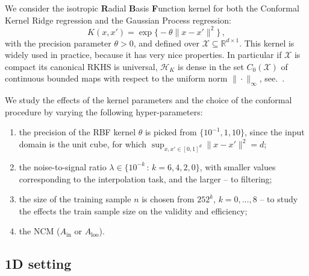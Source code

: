 \documentclass{ITaSconf}
\newcommand{\Hcal}{\mathcal{H}}
\newcommand{\Xcal}{\mathcal{X}}
\newcommand{\Real}{\mathbb{R}}
\begin{document}
We consider the isotropic \textbf{R}adial \textbf{B}asis \textbf{F}unction kernel
for both the Conformal Kernel Ridge regression and the Gaussian Process regression:
\begin{equation*}
  K(x,x')
  = \mathop{\text{exp}}\bigl\{-\theta \|x - x'\|^2\bigr\}
  \,,
\end{equation*}
with the precision parameter $\theta>0$, and defined over $\Xcal \subseteq \Real^{d\times 1}$.
This kernel is widely used in practice, because it has very nice properties. In
particular if $\Xcal$ is compact its canonical RKHS is universal, $\Hcal_K$ is dense
in the set $C_0(\Xcal)$ of continuous bounded maps with respect to the uniform norm
$\|\cdot\|_\infty$, see.~\cite{rbf_universal}.


We study the effects of the kernel parameters and the choice of the conformal procedure
by varying the following hyper-parameters: \begin{enumerate}
  \item the precision of the RBF kernel $\theta$ is picked from $\{10^{-1}, 1, 10\}$,
  since the input domain is the unit cube, for which $\sup_{x,x'\in[0,1]^d}\|x-x'\|^2 = d$;
  \item the noise-to-signal ratio $\lambda \in\{10^{-k}\,:\,k=6, 4, 2, 0\}$, with
  smaller values corresponding to the interpolation task, and the larger -- to filtering;
  \item the size of the training sample $n$ is chosen from $25 2^k$, $k=0,\ldots, 8$ --
  to study the effects the train sample size on the validity and efficiency;
  \item the NCM ($A_{\text{in}}$ or $A_{\text{loo}}$).
\end{enumerate}


\subsection{1D setting} %
\label{sub:1d_setting}
\end{document}
